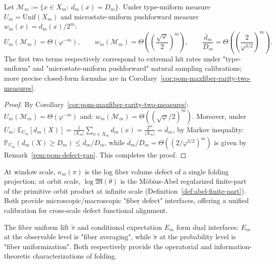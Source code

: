 \begin{corollary}\label{cor:pom-maxfiber-rare-uniform}
Let $\mathcal{M}_m:=\{x\in X_m:\ d_m(x)=D_m\}$. Under type-uniform measure $U_m=\mathrm{Unif}(X_m)$ and microstate-uniform pushforward measure $w_m(x)=d_m(x)/2^m$:
\[
U_m(\mathcal{M}_m)=\Theta(\varphi^{-m}),
\qquad
w_m(\mathcal{M}_m)=\Theta\!\left(\left(\frac{\sqrt{\varphi}}{2}\right)^m\right),\qquad \frac{\overline d_m}{D_m}
=\Theta\!\left(\left(\frac{2}{\varphi^{3/2}}\right)^m\right).
\]
The first two terms respectively correspond to extremal hit rates under "type-uniform" and "microstate-uniform pushforward" natural sampling calibrations; more precise closed-form formulas are in Corollary~\ref{cor:pom-maxfiber-rarity-two-measures}.
\end{corollary}
\begin{proof}
By Corollary~\ref{cor:pom-maxfiber-rarity-two-measures}:
\(
U_m(\mathcal{M}_m)=\Theta(\varphi^{-m})
\)
and:
\(
w_m(\mathcal{M}_m)=\Theta((\sqrt{\varphi}/2)^m)
\).
Moreover, under $U_m$:
\(
\mathbb{E}_{U_m}[d_m(X)]=\frac{1}{|X_m|}\sum_{x\in X_m}d_m(x)=\frac{2^m}{|X_m|}=\overline d_m
\),
by Markov inequality:
\(
\mathbb{P}_{U_m}(d_m(X)\ge D_m)\le \overline d_m/D_m
\),
while $\overline d_m/D_m=\Theta((2/\varphi^{3/2})^m)$ is given by Remark~\ref{rem:pom-defect-gap}. This completes the proof.
\end{proof}

\begin{remark}\label{rem:pom-kappa-logm}
At window scale, $\kappa_m(\pi)$ is the log fiber volume defect of a single folding projection; at orbit scale, $\log\mathfrak{M}(\theta)$ is the Möbius-Abel regularized finite-part of the primitive orbit product at infinite scale (Definition~\ref{def:abel-finite-part}). Both provide microscopic/macroscopic "fiber defect" interfaces, offering a unified calibration for cross-scale defect functional alignment.
\end{remark}

\begin{remark}
The fiber uniform lift $\widetilde\pi$ and conditional expectation $E_m$ form dual interfaces: $E_m$ at the observable level is "fiber averaging", while $\widetilde\pi$ at the probability level is "fiber uniformization". Both respectively provide the operatorial and information-theoretic characterizations of folding.
\end{remark}

